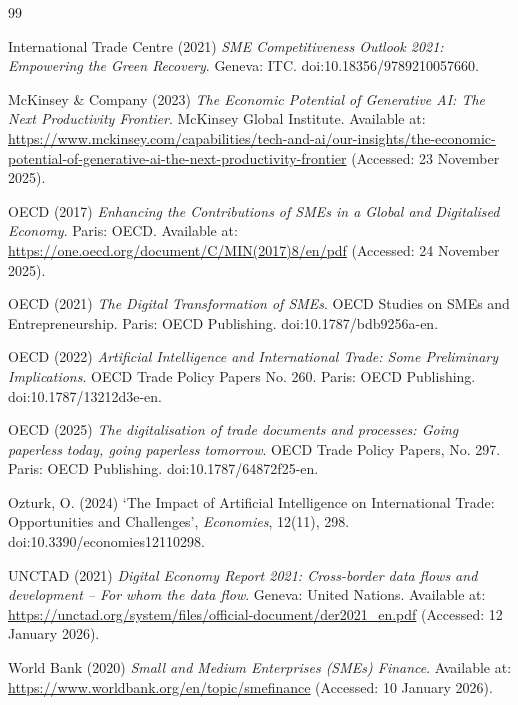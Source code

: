 \documentclass[12pt,a4paper]{report}
\begin{document}
\begingroup
\setlength{\bibhang}{0pt}
\setlength{\bibsep}{0.5em}


\begin{thebibliography}{99}

International Trade Centre (2021) \textit{SME Competitiveness Outlook 2021: Empowering the Green Recovery}. Geneva: ITC. doi:10.18356/9789210057660.

McKinsey \& Company (2023) \textit{The Economic Potential of Generative AI: The Next Productivity Frontier}. McKinsey Global Institute. Available at: \url{https://www.mckinsey.com/capabilities/tech-and-ai/our-insights/the-economic-potential-of-generative-ai-the-next-productivity-frontier} (Accessed: 23 November 2025).

OECD (2017) \textit{Enhancing the Contributions of SMEs in a Global and Digitalised Economy}. Paris: OECD. Available at: \url{https://one.oecd.org/document/C/MIN(2017)8/en/pdf} (Accessed: 24 November 2025).

OECD (2021) \textit{The Digital Transformation of SMEs}. OECD Studies on SMEs and Entrepreneurship. Paris: OECD Publishing. doi:10.1787/bdb9256a-en.

OECD (2022) \textit{Artificial Intelligence and International Trade: Some Preliminary Implications}. OECD Trade Policy Papers No. 260. Paris: OECD Publishing. doi:10.1787/13212d3e-en.

OECD (2025) \textit{The digitalisation of trade documents and processes: Going paperless today, going paperless tomorrow}. OECD Trade Policy Papers, No. 297. Paris: OECD Publishing. doi:10.1787/64872f25-en.

Ozturk, O. (2024) ‘The Impact of Artificial Intelligence on International Trade: Opportunities and Challenges’, \textit{Economies}, 12(11), 298. doi:10.3390/economies12110298.

UNCTAD (2021) \textit{Digital Economy Report 2021: Cross-border data flows and development – For whom the data flow}. Geneva: United Nations. Available at: \url{https://unctad.org/system/files/official-document/der2021_en.pdf} (Accessed: 12 January 2026).

World Bank (2020) \textit{Small and Medium Enterprises (SMEs) Finance}. Available at: \url{https://www.worldbank.org/en/topic/smefinance} (Accessed: 10 January 2026).


\end{thebibliography}
\end{document}
